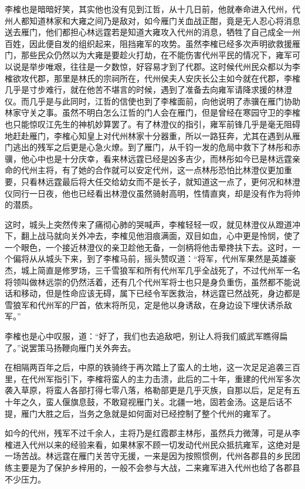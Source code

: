 李榷也是暗暗好笑，其实他也没有见到江哲，从十几日前，他就奉命进入代州，代州人都知道林家和大雍之间乃是敌对，如今雁门关血战正酣，竟是无人忍心将消息送去雁门，他们都担心林远霆若是知道大雍攻入代州的消息，牺牲了自己成全一州百姓，因此便自发的组织起来，阻挡雍军的攻势。虽然李榷已经多次声明欲救援雁门，那些民众仍然以为大雍是要趁火打劫，在不能伤害代州平民的情况下，雍军可以说是举步唯艰，往往是一夕数惊，好容易才到了代郡。这时候代州民众都以为李榷欲攻代郡，那里是林氏的宗祠所在，代州侯夫人安庆长公主如今就在代郡，李榷几乎是寸步难行，就在他苦不堪言的时候，遇到了准备去向雍军请降求援的林澄仪。而几乎是与此同时，江哲的信使也到了李榷面前，向他说明了赤骥在雁门协助林家守关之事。虽然不明白怎么江哲的门人会在雁门，但是曾经在寒园守卫的李榷也只能惊叹江先生的神机妙算罢了。有了林澄仪的指引，雍军前锋几乎是毫无阻碍地赶赴雁门，李榷心知皇上对代州林家十分器重，所以一路狂奔，尤其在遇到从雁门逃出的残军之后更是心急火燎。到了雁门，从千钧一发的危局中救下了林彤和赤骥，他心中也是十分庆幸，看来林远霆已经是凶多吉少，而林彤如今已是林远霆亲命的代州主将，有了她的合作就可以安定代州，这一点林彤恐怕比林澄仪更加重要，只看林远霆最后将大任交给幼女而不是长子，就知道这一点了，更何况和林澄仪同行一日夜，他也已经看出林澄仪虽然骑射高明，性情直爽，却是没有作为将帅的潜质。

这时，城头上突然传来了痛彻心肺的哭喊声，李榷轻轻一叹，就见林澄仪从蹬道冲下，翻上战马就向关外冲去，李榷见他泪痕满面，双目如血，心中更是怜悯，使了一个眼色，一个接近林澄仪的亲卫趁他无备，一剑柄将他击晕搀扶下去。这时，一个偏将从从城头下来，到了李榷马前，摇头赞叹道：“将军，代州军果然是英雄豪杰，城上简直是修罗场，三千雪狼军和所有代州军几乎全战死了，不过代州军一名将领叫做林远崇的仍然活着，还有几个代州军将士也只是身负重伤，虽然都不能说话和移动，但是性命应该无碍，属下已经令军医救治，林远霆已然战死，身边都是雪狼军和代州军的尸首，依末将所见，定是他以身诱敌，在身边设下埋伏诱杀敌军。”

李榷也是心中叹服，道：“好了，我们也去追敌吧，别让人将我们威武军瞧得扁了。”说罢策马扬鞭向雁门关外奔去。

在相隔两百年之后，中原的铁骑终于再次踏上了蛮人的土地，这一次足足追袭三百里，在代州军指引下，李榷将蛮人的主力击溃，此后的二十年，重建的代州军多次袭入草原，将蛮人各部打得七零八落，格勒部更是几乎灭族，自那以后，足足有五十年之久，蛮人偃旗息鼓，不敢窥视雁门关。北疆一地，固若金汤。这是后话不提，雁门大胜之后，当务之急就是如何面对已经控制了整个代州的雍军了。

如今的代州，残军不过千余人，主将乃是红霞郡主林彤，虽然兵力微薄，可是从李榷进入代州以来的经验来看，如果林家不顾一切发动代州民众抵抗雍军，这绝对是一场苦战。林远霆在雁门关苦守无援，一来是因为按照惯例，代州各郡县的乡民团练主要是为了保护乡梓用的，一般不会参与大战，二来雍军进入代州也给了各郡县不少压力。

